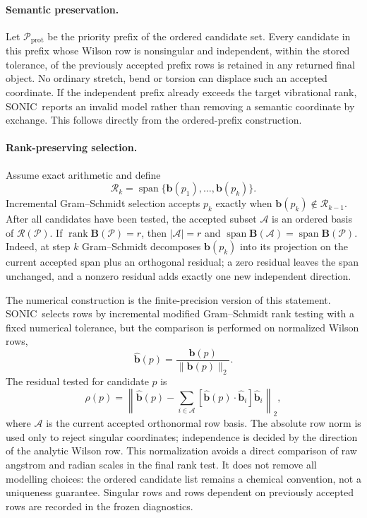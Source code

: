 \documentclass[journal=jctcce,manuscript=article,layout=traditional]{achemso}
\newcommand{\SONIC}{SONIC}
\newcommand{\Bmat}{\mathbf{B}}
\newcommand{\bmat}{\mathbf{b}}
\theoremstyle{definition}
\begin{document}
\paragraph{Semantic preservation.}
\label{prop:protected}
Let \(\mathcal{P}_{\mathrm{prot}}\) be the priority prefix of the ordered
candidate set.  Every candidate in this prefix whose Wilson row is nonsingular
and independent, within the stored tolerance, of the previously accepted prefix
rows is retained in any returned final object.  No ordinary stretch, bend or
torsion can displace such an accepted coordinate.  If the independent prefix
already exceeds the target vibrational rank, \SONIC\ reports an invalid model
rather than removing a semantic coordinate by exchange.  This follows directly
from the ordered-prefix construction.

\paragraph{Rank-preserving selection.}
\label{prop:rank-selection}
Assume exact arithmetic and define
\[
  \mathcal{R}_k=\operatorname{span}\{\bmat(p_1),\ldots,\bmat(p_k)\}.
\]
Incremental Gram--Schmidt selection accepts \(p_k\) exactly when
\(\bmat(p_k)\notin\mathcal{R}_{k-1}\).  After all candidates have been tested,
the accepted subset \(\mathcal{A}\) is an ordered basis of
\(\mathcal{R}(\mathcal{P})\).  If
\(\operatorname{rank}\Bmat(\mathcal{P})=r\), then
\(|\mathcal{A}|=r\) and
\(\operatorname{span}\Bmat(\mathcal{A})=\operatorname{span}\Bmat(\mathcal{P})\).
Indeed, at step \(k\) Gram--Schmidt decomposes \(\bmat(p_k)\) into its
projection on the current accepted span plus an orthogonal residual; a zero
residual leaves the span unchanged, and a nonzero residual adds exactly one
new independent direction.

The numerical construction is the finite-precision version of this statement.  \SONIC\
selects rows by incremental modified Gram--Schmidt rank testing with a fixed
numerical tolerance, but the comparison is performed on normalized Wilson rows,
\begin{equation}
  \hat{\bmat}(p) = \frac{\bmat(p)}{\|\bmat(p)\|_2}.
\end{equation}
The residual tested for candidate \(p\) is
\begin{equation}
  \rho(p) =
  \left\|
    \hat{\bmat}(p) -
    \sum_{i \in \mathcal{A}}
    \left[\hat{\bmat}(p)\cdot \hat{\bmat}_i\right]\hat{\bmat}_i
  \right\|_2 ,
\end{equation}
where \(\mathcal{A}\) is the current accepted orthonormal row basis.  The
absolute row norm is used only to reject singular coordinates; independence is
decided by the direction of the analytic Wilson row.  This normalization avoids
a direct comparison of raw angstrom and radian scales in the final rank test.
It does not remove all modelling choices: the ordered candidate list remains a
chemical convention, not a uniqueness guarantee.  Singular rows and rows
dependent on previously accepted rows are recorded in the frozen diagnostics.
\end{document}
